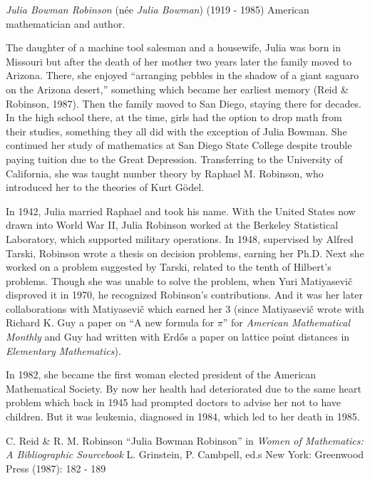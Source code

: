 \documentclass[12pt]{article}
\begin{document}

\emph{Julia Bowman Robinson} (n\'ee \emph{Julia Bowman}) (1919 - 1985) American mathematician and author.

The daughter of a machine tool salesman and a housewife, Julia was born in Missouri but after the death of her mother two years later the family moved to Arizona. There, she enjoyed ``arranging pebbles in the shadow of a giant saguaro on the Arizona desert,'' something which became her earliest memory (Reid \& Robinson, 1987). Then the family moved to San Diego, staying there for decades. In the high school there, at the time, girls had the option to drop math from their studies, something they all did with the exception of Julia Bowman. She continued her study of mathematics at San Diego State College despite trouble paying tuition due to the Great Depression. Transferring to the University of California, she was taught number theory by Raphael M. Robinson, who introduced her to the theories of Kurt G\"odel.

In 1942, Julia married Raphael and took his name. With the United States now drawn into World War II, Julia Robinson worked at the Berkeley Statistical Laboratory, which supported military operations. In 1948, supervised by Alfred Tarski, Robinson wrote a thesis on decision problems, earning her Ph.D. Next she worked on a problem suggested by Tarski, related to the tenth of Hilbert's problems. Though she was unable to solve the problem, when Yuri Matiyasevi\v{c} disproved it in 1970, he recognized Robinson's contributions. And it was her later collaborations with Matiyasevi\v{c} which earned her  3 (since Matiyasevi\v{c} wrote with Richard K. Guy a paper on ``A new formula for $\pi$'' for {\it American Mathematical Monthly} and Guy had written with Erd\H{o}s a paper on lattice point distances in {\it Elementary Mathematics}).

In 1982, she became the first woman elected president of the American Mathematical Society. By now her health had deteriorated due to the same heart problem which back in 1945 had prompted doctors to advise her not to have children. But it was leukemia, diagnosed in 1984, which led to her death in 1985.

\begin{thebibliography}{1}
 C. Reid \& R. M. Robinson ``Julia Bowman Robinson'' in {\it Women of Mathematics: A Bibliographic Sourcebook} L. Grinstein, P. Cambpell, ed.s New York: Greenwood Press (1987): 182 - 189
\end{thebibliography}

\end{document}
